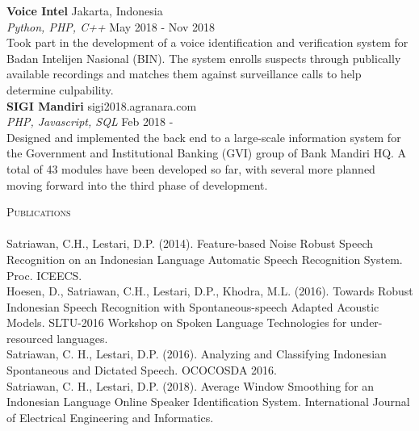 \documentclass[a4paper]{article}
\newcommand{\lineunder} {
    \vspace*{-8pt} \\
    \hspace*{-18pt} \hrulefill \\
}
\newcommand{\header} [1] {
    {\hspace*{-18pt}\vspace*{6pt} \textsc{#1}}
    \vspace*{-6pt} \lineunder
}
\begin{document}
{\textbf{Voice Intel}} \hfill Jakarta, Indonesia \\
{\sl Python, PHP, C++} \hfill May 2018 - Nov 2018 \\
\vspace*{1mm}
Took part in the development of a voice identification and verification system
for Badan Intelijen Nasional (BIN). The system enrolls suspects through
publically available recordings and matches them against surveillance calls to
help determine culpability.\\
\vspace*{3mm}
{\textbf{SIGI Mandiri}}  \hfill sigi2018.agranara.com\\
{\sl PHP, Javascript, SQL} \hfill Feb 2018 - \\
\vspace*{1mm}
Designed and implemented the back end to a large-scale information system for
the Government and Institutional Banking (GVI) group of Bank Mandiri HQ. A
total of 43 modules have been developed so far, with several more planned
moving forward into the third phase of development.\\
\vspace*{3mm}

\header{Publications}
\vspace{2mm}
Satriawan, C.H., Lestari, D.P. (2014). Feature-based Noise Robust Speech Recognition on an Indonesian Language Automatic Speech Recognition System.
Proc. ICEECS.\\
\vspace*{3mm}
Hoesen, D., Satriawan, C.H., Lestari, D.P., Khodra, M.L. (2016). Towards Robust Indonesian Speech Recognition with Spontaneous-speech Adapted Acoustic Models.
SLTU-2016 Workshop on Spoken Language Technologies for under-resourced
languages.\\
\vspace*{3mm}
Satriawan, C. H., Lestari, D.P. (2016). Analyzing and Classifying Indonesian Spontaneous and Dictated Speech. OCOCOSDA 2016.\\
\vspace*{3mm}
Satriawan, C. H., Lestari, D.P. (2018). Average Window Smoothing for an
Indonesian Language Online Speaker Identification System.
International Journal of Electrical Engineering and Informatics.\\

\ 
\end{document}
